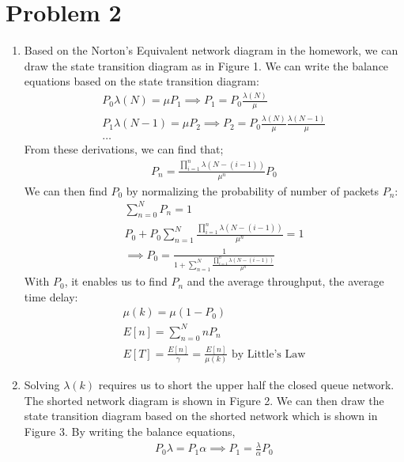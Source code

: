 \documentclass{article}
\begin{document}
\section*{Problem 2}
	\begin{enumerate}
		\item Based on the Norton's Equivalent network diagram in the homework, we
			can draw the state transition diagram as in Figure 1.
			We can write the balance equations based on the state transition diagram:
			\begin{gather*}
				P_{0} \lambda(N) = \mu P_{1} \implies P_{1} = P_{0} \frac{\lambda(N)}{\mu} \\
				P_{1} \lambda(N-1) = \mu P_{2} \implies P_{2} = P_{0} \frac{\lambda(N)}{\mu} \frac{\lambda(N-1)}{\mu} \\
				\ldots
			\end{gather*}
			From these derivations, we can find that;
			\begin{align*}
				P_{n} = \frac{\prod\limits_{i=1}^{n} \lambda(N-(i-1))}{\mu^{n}} P_{0}
			\end{align*}
			We can then find $P_{0}$ by normalizing the probability of number of
			packets $P_{n}$:
			\begin{gather*}
				\sum\limits_{n=0}^{N} P_{n} = 1 \\
				P_{0} + P_{0} \sum\limits_{n=1}^{N} \frac{\prod\limits_{i=1}^{n} \lambda(N-(i-1))}{\mu^{n}} = 1 \\
				\implies P_{0} = \frac{1}{1 + \sum\limits_{n=1}^{N} \frac{\prod\limits_{i=1}^{n} \lambda(N-(i-1))}{\mu^{n}}}
			\end{gather*}
			With $P_{0}$, it enables us to find $P_{n}$ and the average throughput,
			the average time delay:
			\begin{gather*}
				\mu(k) = \mu(1 - P_{0}) \\
				E[n] = \sum\limits_{n=0}^{N} nP_{n} \\
				E[T] = \frac{E[n]}{\gamma} = \frac{E[n]}{\mu(k)} \text{ by Little's Law}
			\end{gather*}
		\item Solving $\lambda(k)$ requires us to short the upper half the closed
			queue network. The shorted network diagram is shown in Figure 2.
			We can then draw the state transition diagram based on the shorted
			network which is shown in Figure 3.
			By writing the balance equations,
			\begin{gather*}
				P_{0} \lambda = P_{1} \alpha \implies P_{1} = \frac{\lambda}{\alpha} P_{0} \\

\end{gather*}
\end{enumerate}
\end{document}
